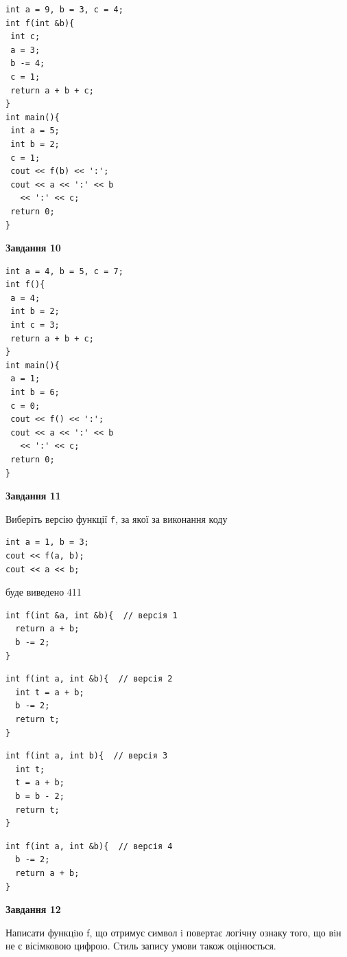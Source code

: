 \documentclass[12pt, ukrainian]{article}
\def\code#1{\Verb!#1!}
\begin{document}
{\begin {large}
\begin{minipage}[t]{7.0cm}
\begin{verbatim}
int a = 9, b = 3, c = 4;
int f(int &b){
 int c;
 a = 3;
 b -= 4;
 c = 1;
 return a + b + c;
}
int main(){
 int a = 5;
 int b = 2;
 c = 1;
 cout << f(b) << ':';
 cout << a << ':' << b 
   << ':' << c;
 return 0;
}
\end{verbatim}



\begin{center}
\textbf{Завдання 10}
\end{center}
\vspace{-8mm}

\begin{verbatim}
int a = 4, b = 5, c = 7;
int f(){
 a = 4;
 int b = 2;
 int c = 3;
 return a + b + c;
}
int main(){
 a = 1;
 int b = 6;
 c = 0;
 cout << f() << ':';
 cout << a << ':' << b 
   << ':' << c;
 return 0;
}
\end{verbatim}

\end{minipage}
\vline \hspace{1mm}
\begin{minipage}[t]{11.0cm}

\begin{center}
\textbf{Завдання 11}
\end{center}
Виберіть версію функції \code{f}, за якої за виконання коду
\begin{verbatim}
int a = 1, b = 3;
cout << f(a, b);
cout << a << b;
\end{verbatim}

буде виведено 411

\begin{verbatim}
int f(int &a, int &b){  // версія 1
  return a + b;
  b -= 2;
}
\end{verbatim}

\vspace{-8mm}\begin{verbatim}
int f(int a, int &b){  // версія 2
  int t = a + b;
  b -= 2;
  return t;
}
\end{verbatim}

\vspace{-8mm}\begin{verbatim}
int f(int a, int b){  // версія 3
  int t;
  t = a + b;
  b = b - 2;
  return t;
}
\end{verbatim}

\vspace{-8mm}\begin{verbatim}
int f(int a, int &b){  // версія 4
  b -= 2;
  return a + b;
}
\end{verbatim}



\begin{center}
\textbf{Завдання 12}
\end{center}

Написати функцiю f, що отримує символ i повертає логічну ознаку того, що вiн не є вісімковою цифрою. Стиль запису умови також оцінюється.\par

\end{minipage}

\end {large}}
\newpage
\end{document}

